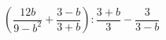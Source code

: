 \begin{ex}[type=expression]
	\begin{condition}
		\( \left( \dfrac{12b}{9-b^2}+\dfrac{3-b}{3+b} \right):\dfrac{3+b}{3}-\dfrac{3}{3-b} \)
	\end{condition}
\end{ex}